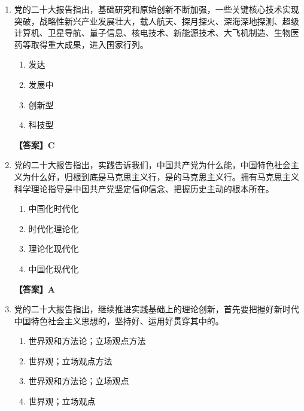 \documentclass[UTF8,11pt,a4paper]{ctexart}
\begin{document}
\begin{enumerate}[label=\textbf{\arabic*.}, leftmargin=2.5em, itemsep=0.7em]
\begin{enumerate}[label=\Alph*., leftmargin=2em, itemsep=0.1em, topsep=0.15em]
\item 八千万
\item 九千万
\item 一亿
\item 一亿三千万
\end{enumerate}
\textbf{【答案】C}
\item 党的二十大报告指出，基础研究和原始创新不断加强，一些关键核心技术实现突破，战略性新兴产业发展壮大，载人航天、探月探火、深海深地探测、超级计算机、卫星导航、量子信息、核电技术、新能源技术、大飞机制造、生物医药等取得重大成果，进入\allowbreak\underline{\hspace{4em}}国家行列。
\begin{enumerate}[label=\Alph*., leftmargin=2em, itemsep=0.1em, topsep=0.15em]
\item 发达
\item 发展中
\item 创新型
\item 科技型
\end{enumerate}
\textbf{【答案】C}
\item 党的二十大报告指出，实践告诉我们，中国共产党为什么能，中国特色社会主义为什么好，归根到底是马克思主义行，是\allowbreak\underline{\hspace{4em}}的马克思主义行。拥有马克思主义科学理论指导是中国共产党坚定信仰信念、把握历史主动的根本所在。
\begin{enumerate}[label=\Alph*., leftmargin=2em, itemsep=0.1em, topsep=0.15em]
\item 中国化时代化
\item 时代化理论化
\item 理论化现代化
\item 中国化现代化
\end{enumerate}
\textbf{【答案】A}
\item 党的二十大报告指出，继续推进实践基础上的理论创新，首先要把握好新时代中国特色社会主义思想的\allowbreak\underline{\hspace{4em}}，坚持好、运用好贯穿其中的\allowbreak\underline{\hspace{4em}}。
\begin{enumerate}[label=\Alph*., leftmargin=2em, itemsep=0.1em, topsep=0.15em]
\item 世界观和方法论；立场观点方法
\item 世界观；立场观点方法
\item 世界观和方法论；立场观点
\item 世界观；立场观点

\end{enumerate}
\end{enumerate}
\end{document}
